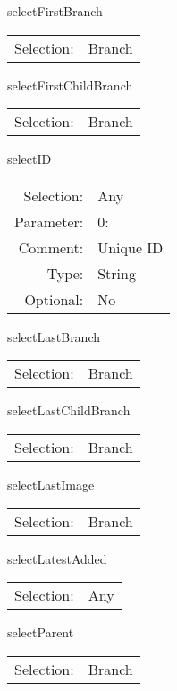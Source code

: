 \item selectFirstBranch\\
\begin{tabular}{rl}
  Selection: & Branch\\
\end{tabular}

\item selectFirstChildBranch\\
\begin{tabular}{rl}
  Selection: & Branch\\
\end{tabular}

\item selectID\\
\begin{tabular}{rl}
  Selection: & Any\\
   Parameter: &  0:\\
        Comment: & Unique ID\\
           Type: & String\\
       Optional: &  No\\
\end{tabular}

\item selectLastBranch\\
\begin{tabular}{rl}
  Selection: & Branch\\
\end{tabular}

\item selectLastChildBranch\\
\begin{tabular}{rl}
  Selection: & Branch\\
\end{tabular}

\item selectLastImage\\
\begin{tabular}{rl}
  Selection: & Branch\\
\end{tabular}

\item selectLatestAdded\\
\begin{tabular}{rl}
  Selection: & Any\\
\end{tabular}

\item selectParent\\
\begin{tabular}{rl}
  Selection: & Branch\\
\end{tabular}

